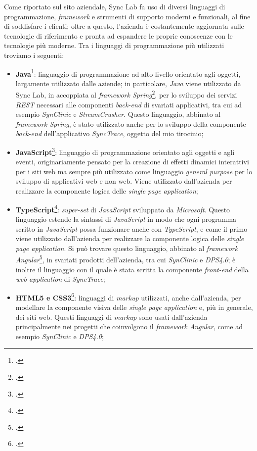 Come riportato sul sito aziendale, Sync Lab fa uso di diversi linguaggi di programmazione, \textit{framework} e strumenti di supporto moderni e funzionali, al fine di soddisfare i clienti; oltre a questo, l'azienda è costantemente aggiornata sulle tecnologie di riferimento e pronta ad espandere le proprie conoscenze con le tecnologie più moderne.
Tra i linguaggi di programmazione più utilizzati troviamo i seguenti:
\begin{itemize}
  \item \textbf{Java}\footcite{tec:java}: linguaggio di programmazione ad alto livello orientato agli oggetti, largamente utilizzato dalle aziende; in particolare, \textit{Java} viene utilizzato da Sync Lab, in accoppiata al \textit{framework Spring}\footcite{tec:spring}, per lo sviluppo dei servizi \textit{REST} necessari alle componenti \textit{back-end} di svariati applicativi, tra cui ad esempio \textit{SynClinic} e \textit{StreamCrusher}. Questo linguaggio, abbinato al \textit{framework Spring}, è stato utilizzato anche per lo sviluppo della componente \textit{back-end} dell'applicativo \textit{SyncTrace}, oggetto del mio tirocinio;

  \item \textbf{JavaScript}\footcite{tec:javascript}: linguaggio di programmazione orientato agli oggetti e agli eventi, originariamente pensato per la creazione di effetti dinamici interattivi per i siti web ma sempre più utilizzato come linguaggio \textit{general purpose} per lo sviluppo di applicativi web e non web. Viene utilizzato dall'azienda per realizzare la componente logica delle \textit{single page application};

  \item \textbf{TypeScript}\footcite{tec:typescript}: \textit{super-set} di \textit{JavaScript} sviluppato da \textit{Microsoft}. Questo linguaggio estende la sintassi di \textit{JavaScript} in modo che ogni programma scritto in \textit{JavaScript} possa funzionare anche con \textit{TypeScript}, e come il primo viene utilizzato dall'azienda per realizzare la componente logica delle \textit{single page application}. Si può trovare questo linguaggio, abbinato al \textit{framework Angular}\footcite{tec:angular}, in svariati prodotti dell'azienda, tra cui \textit{SynClinic} e \textit{DPS4.0}; è inoltre il linguaggio con il quale è stata scritta la componente \textit{front-end} della \textit{web application} di \textit{SyncTrace};

  \item \textbf{HTML5 e CSS3}\footcite{tec:htmlcss}: linguaggi di \textit{markup} utilizzati, anche dall'azienda, per modellare la componente visiva delle \textit{single page application} e, più in generale, dei siti web. Questi linguaggi di \textit{markup} sono usati dall'azienda principalmente nei progetti che coinvolgono il \textit{framework Angular}, come ad esempio \textit{SynClinic} e \textit{DPS4.0};


\end{itemize}
